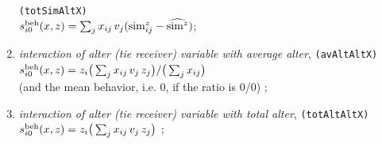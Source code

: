 \documentclass[a4paper,fleqn,11pt]{article}
\newcommand{\+}{\, + \,}
\newcommand{\vit}{\theenumi}
\newcounter{savenumi}
\begin{document}
\begin{enumerate}
                       \texttt{(totSimAltX)} \\
 $s^{\rm beh}_{i\vit}(x, z) =
         \sum_j x_{ij} \, v_j ({\rm sim}^z_{ij} - \widehat{{\rm sim}^z}) $;
\item {\em interaction of alter (tie receiver) variable with average alter},
                       \texttt{(avAltAltX)} \\
 $s^{\rm beh}_{i\vit}(x, z) =  z_i \big( \sum_j x_{ij} \, v_j \, z_j \big)
                                / \big (\sum_j x_{ij}\big)  $\\
 (and the mean behavior, i.e. $0$, if the ratio is 0/0) ;
\item {\em interaction of alter (tie receiver) variable with total alter},
                       \texttt{(totAltAltX)} \\
 $s^{\rm beh}_{i\vit}(x, z) =  z_i \big( \sum_j x_{ij} \, v_j \, z_j \big) $ ;
\setcounter{savenumi}{\value{enumi}}
\end{enumerate}

\end{document}
